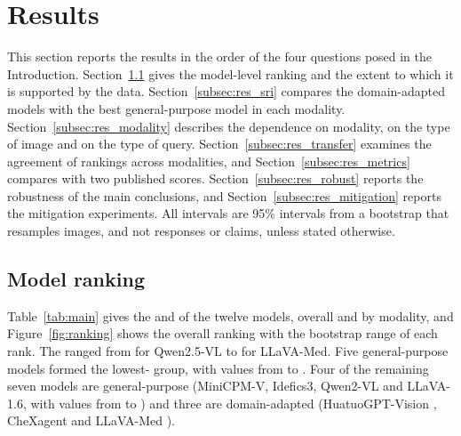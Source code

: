 \section{Results}
\label{sec:results}


This section reports the results in the order of the four questions posed in the Introduction. Section~\ref{subsec:res_ranking} gives the model-level ranking and the extent to which it is supported by the data. Section~\ref{subsec:res_sri} compares the domain-adapted models with the best general-purpose model in each modality. Section~\ref{subsec:res_modality} describes the dependence on modality, on the type of image and on the type of query. Section~\ref{subsec:res_transfer} examines the agreement of rankings across modalities, and Section~\ref{subsec:res_metrics} compares \SMHR{} with two published scores. Section~\ref{subsec:res_robust} reports the robustness of the main conclusions, and Section~\ref{subsec:res_mitigation} reports the mitigation experiments. All intervals are 95\% intervals from a bootstrap that resamples images, and not responses or claims, unless stated otherwise.

\subsection{Model ranking}
\label{subsec:res_ranking}

Table~\ref{tab:main} gives the \SMHR{} and \CHR{} of the twelve models, overall and by modality, and Figure~\ref{fig:ranking} shows the overall ranking with the bootstrap range of each rank. The \SMHR{} ranged from  for Qwen2.5-VL to  for LLaVA-Med. Five general-purpose models formed the lowest-\SMHR{} group, with values from  to . Four of the remaining seven models are general-purpose (MiniCPM-V, Idefics3, Qwen2-VL and LLaVA-1.6, with values from  to ) and three are domain-adapted (HuatuoGPT-Vision , CheXagent  and LLaVA-Med ).

